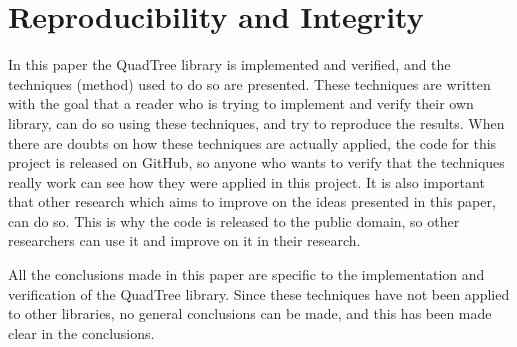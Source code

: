 \section{Reproducibility and Integrity}
In this paper the QuadTree library is implemented and verified, and the techniques (method) used to do so are presented. These techniques are written with the goal that a reader who is trying to implement and verify their own library, can do so using these techniques, and try to reproduce the results. When there are doubts on how these techniques are actually applied, the code for this project is released on GitHub, so anyone who wants to verify that the techniques really work can see how they were applied in this project. It is also important that other research which aims to improve on the ideas presented in this paper, can do so. This is why the code is released to the public domain, so other researchers can use it and improve on it in their research.

All the conclusions made in this paper are specific to the implementation and verification of the QuadTree library. Since these techniques have not been applied to other libraries, no general conclusions can be made, and this has been made clear in the conclusions.
